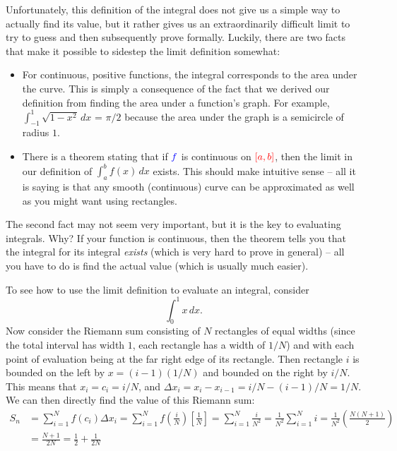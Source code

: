 \documentclass{myarticle}
\newcommand{\hor}[1]{\textcolor{red}{#1}}
\newcommand{\ver}[1]{\textcolor{blue}{#1}}
\theoremstyle{nospace}
\newtheorem{old series theorem}{Theorem}
\newenvironment{series theorem}
{\begin{mdframed}\begin{old series theorem}}
    {\end{old series theorem}\end{mdframed}}
\begin{document}
Unfortunately, this definition of the integral does not give us a
simple way to actually find its value, but it rather gives us an
extraordinarily difficult limit to try to guess and then subsequently
prove formally. Luckily, there are two facts that make it possible to
sidestep the limit definition somewhat:

\begin{itemize}
\item For continuous, positive functions, the integral corresponds to
  the area under the curve. This is simply a consequence of the fact
  that we derived our definition from finding the area under a
  function's graph. For example, $\int_{-1}^1 \sqrt{1 - x^2} \,dx$ =
  $\pi/2$ because the area under the graph is a semicircle of radius
  $1$.
\item There is a theorem stating that if $\ver{f}$ is continuous on
  $\hor{[a, b]}$, then the limit in our definition of
  $\int_a^b f(x) \,dx$ exists. This should make intuitive sense -- all
  it is saying is that any smooth (continuous) curve can be
  approximated as well as you might want using rectangles.
\end{itemize}

The second fact may not seem very important, but it is the key to
evaluating integrals. Why? If your function is continuous, then the
theorem tells you that the integral for its integral \emph{exists}
(which is very hard to prove in general) -- all you have to do is find
the actual value (which is usually much easier).

To see how to use the limit definition to evaluate an integral,
consider
\[
  \int_0^1 x \,dx.
\]
Now consider the Riemann sum consisting of $N$ rectangles of equal
widths (since the total interval has width $1$, each rectangle has a
width of $1/N$) and with each point of evaluation being at the far
right edge of its rectangle. Then rectangle $i$ is bounded on the left
by $x = (i - 1)(1/N)$ and bounded on the right by $i/N$. This means
that $x_i = c_i = i/N$, and
$\Delta x_i = x_i - x_{i-1} = i/N - (i - 1)/N = 1/N$. We can then
directly find the value of this Riemann sum:
\begin{align*}
  S_n
  &= \sum_{i=1}^N f(c_i)\Delta x_i
    = \sum_{i=1}^N
    f\left(\frac{i}{N}\right)\left[\frac{1}{N}\right]
    = \sum_{i=1}^N \frac{i}{N^2}
    = \frac{1}{N^2}\sum_{i=1}^N i
    = \frac{1}{N^2}\left(\frac{N(N+1)}{2}\right) \\
  &= \frac{N+1}{2N}
    = \frac{1}{2} + \frac{1}{2N}
\end{align*}
\end{document}

